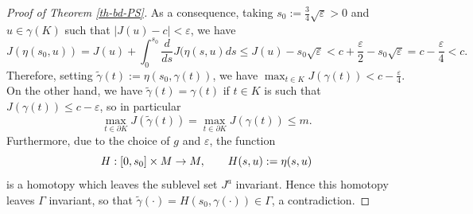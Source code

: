 \documentclass[11pt,reqno]{amsart}
\theoremstyle{definition}
\numberwithin{equation}{section}
\numberwithin{theorem}{section}
\numberwithin{equation}{section}
\numberwithin{theorem}{section}
\begin{document}
\begin{proof}[Proof of Theorem \ref{th-bd-PS}]
As a consequence, taking $s_0:=\frac{3}{4}\sqrt{\varepsilon}>0$ and $u\in\gamma(K)$ such that $|J(u)-c|<\varepsilon$, we have
\begin{equation}
\label{decrease-J}
J(\eta(s_0,u))=J(u)+\int_0^{s_0}\frac{d}{ds}J(\eta(s,u)ds\le J(u)-s_0\sqrt{\varepsilon}<c+\frac{\varepsilon}{2}-s_0\sqrt{\varepsilon}=c-\frac{\varepsilon}{4}<c.    
\end{equation}
Therefore, setting $\tilde{\gamma}(t):=\eta(s_0,\gamma(t))$, we have $\max_{t\in K} J(\gamma(t))<c-\frac{\varepsilon}{4}$.\\

On the other hand, we have $\tilde{\gamma}(t)=\gamma(t)$ if $t\in K$ is such that $J(\gamma(t))\le c-\varepsilon$, so in particular
$$\max_{t\in\partial K}J(\tilde{\gamma}(t))=\max_{t\in \partial K}J(\gamma(t))\le m.$$
Furthermore, due to the choice of $g$ and $\varepsilon$, the function 
\begin{equation}\notag
H:[0,s_0]\times M\to M,\qquad H(s,u):=\eta(s,u)  
\end{equation}
is a homotopy which leaves the sublevel set $J^a$ invariant. Hence this homotopy leaves $\Gamma$ invariant, so that $\tilde{\gamma}(\cdotp)=H(s_0,\gamma(\cdotp))\in \Gamma$, a contradiction.
\end{proof}
\end{document}
